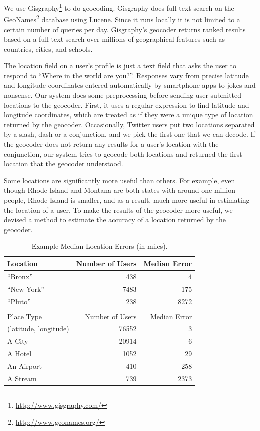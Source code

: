 We use Gisgraphy\footnote{\url{http://www.gisgraphy.com/}} to do geocoding.
%
Gisgraphy does full-text search on the
GeoNames\footnote{\url{http://www.geonames.org/}} database using Lucene.
%
Since it runs locally it is not limited to a certain number of queries per day.
%
Gisgraphy's geocoder returns ranked results based on a full text search
over millions of geographical features such as countries, cities, and schools.

The location field on a user's profile is just a text field that asks the user
to respond to ``Where in the world are you?''.
%
Responses vary from precise latitude and longitude coordinates entered
automatically by smartphone apps to jokes and nonsense.
%
Our system does some preprocessing before sending user-submitted locations to
the geocoder.
%
First, it uses a regular expression to find latitude and longitude coordinates,
which are treated as if they were a unique type of location returned by the
geocoder.
%
Occasionally, Twitter users put two locations separated by a slash, dash or a
conjunction, and we pick the first one that we can decode.
%
If the geocoder does not return any results for a user's location with the
conjunction, our system tries to geocode both locations and returned the first
location that the geocoder understood.

Some locations are significantly more useful than others.
%
For example, even though Rhode Island and Montana are both states with around
one million people, Rhode Island is smaller, and as a result, much more useful
in estimating the location of a user.
%
To make the results of the geocoder more useful, we devised a method to
estimate the accuracy of a location returned by the geocoder.

\begin{table}[tb]
\centering
\caption{Example Median Location Errors (in miles).}
\begin{tabular}{l r r}
Location&Number of Users&Median Error\\ \hline
``Bronx''&438&4\\
``New York''&7483&175\\
``Pluto''&238&8272\\ \hline
\\
Place Type&Number of Users&Median Error\\ \hline
(latitude, longitude)&76552&3\\
A City&20914&6\\
A Hotel&1052&29\\
An Airport&410&258\\
A Stream&739&2373\\
\hline\end{tabular}
\label{tab:MedianLocErr}
\end{table}

